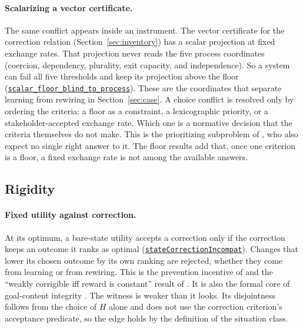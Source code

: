 \documentclass[11pt]{article}
\newcommand{\lean}[1]{\hyperref[lean:#1]{\nolinkurl{#1}}}
\begin{document}
\paragraph{Scalarizing a vector certificate.}
The same conflict appears inside an instrument.
The vector certificate for the correction relation (Section~\ref{sec:inventory}) has a scalar projection at fixed exchange rates.
That projection never reads the five process coordinates (coercion, dependency, plurality, exit capacity, and independence).
So a system can fail all five thresholds and keep its projection above the floor (\lean{scalar_floor_blind_to_process}).
These are the coordinates that separate learning from rewiring in Section~\ref{sec:case}.
A choice conflict is resolved only by ordering the criteria: a floor as a constraint, a lexicographic priority, or a stakeholder-accepted exchange rate.
Which one is a normative decision that the criteria themselves do not make.
This is the prioritizing subproblem of \textcite{harris2026taxonomy}, who also expect no single right answer to it.
The floor results add that, once one criterion is a floor, a fixed exchange rate is not among the available answers.

\subsection{Rigidity}
\label{sec:rigidity}

\paragraph{Fixed utility against correction.}
At its optimum, a bare-state utility accepts a correction only if the correction keeps an outcome it ranks as optimal (\lean{stateCorrectionIncompat}).
Changes that lower its chosen outcome by its own ranking are rejected, whether they come from learning or from rewiring.
This is the prevention incentive of \textcite{soares2015corrigibility} and the ``weakly corrigible iff reward is constant'' result of \textcite{turner2021corrigibilityvnm}.
It is also the formal core of goal-content integrity \parencite{omohundro2008basic}.
The witness is weaker than it looks.
Its disjointness follows from the choice of $H$ alone and does not use the correction criterion's acceptance predicate, so the edge holds by the definition of the situation class.
\end{document}
